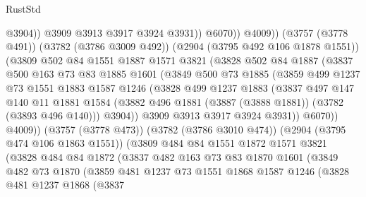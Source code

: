 \begin{lexlean}{RustStd}
\begin{coremodule}
                            @3904))
                        @3909
                        @3913
                        @3917
                        @3924
                        @3931))
                    @6070))
                @4009))
            (@3757 (@3778 @491))
            (@3782 (@3786 @3009 @492))
            (@2904 (@3795 @492 @106 @1878 @1551))
            (@3809
              @502
              @84
              @1551
              @1887
              @1571
              @3821
              (@3828
                @502
                @84
                @1887
                (@3837
                  @500
                  @163
                  @73
                  @83
                  @1885
                  @1601
                  (@3849
                    @500
                    @73
                    @1885
                    (@3859
                      @499
                      @1237
                      @73
                      @1551
                      @1883
                      @1587
                      @1246
                      (@3828
                        @499
                        @1237
                        @1883
                        (@3837
                          @497
                          @147
                          @140
                          @11
                          @1881
                          @1584
                          (@3882 @496 @1881 (@3887 (@3888 @1881)) (@3782 (@3893 @496 @140)))
                          @3904))
                      @3909
                      @3913
                      @3917
                      @3924
                      @3931))
                  @6070))
              @4009))
          (@3757 (@3778 @473))
          (@3782 (@3786 @3010 @474))
          (@2904 (@3795 @474 @106 @1863 @1551))
          (@3809
            @484
            @84
            @1551
            @1872
            @1571
            @3821
            (@3828
              @484
              @84
              @1872
              (@3837
                @482
                @163
                @73
                @83
                @1870
                @1601
                (@3849
                  @482
                  @73
                  @1870
                  (@3859
                    @481
                    @1237
                    @73
                    @1551
                    @1868
                    @1587
                    @1246
                    (@3828
                      @481
                      @1237
                      @1868
                      (@3837

\end{coremodule}
\end{lexlean}
